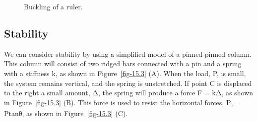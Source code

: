 \documentclass[
  letterpaper,
  DIV=11,
  numbers=noendperiod]{scrreprt}
\theoremstyle{definition}
\theoremstyle{remark}
\begin{document}
\begin{figure}


\caption{\label{fig-15.2}Buckling of a ruler.}

\end{figure}%

\subsection{Stability}\label{stability}

We can consider stability by using a simplified model of a pinned-pinned
column. This column will consist of two ridged bars connected with a pin
and a spring with a stiffness k, as shown in Figure~\ref{fig-15.3} (A).
When the load, P, is small, the system remains vertical, and the spring
is unstretched. If point C is displaced to the right a small amount, Δ,
the spring will produce a force F = kΔ, as shown in
Figure~\ref{fig-15.3} (B). This force is used to resist the horizontal
forces, P\textsubscript{x} = Ptanθ, as shown in Figure~\ref{fig-15.3}
(C).
\end{document}
